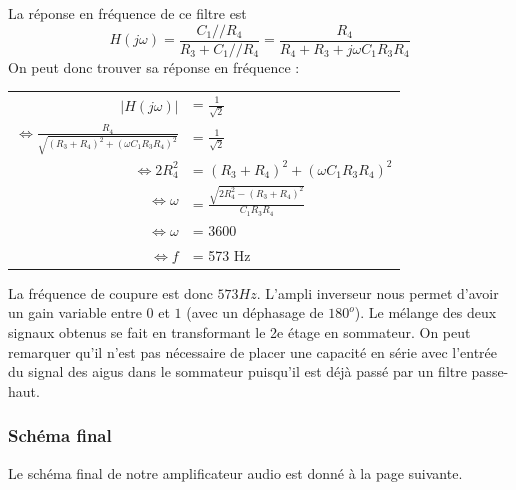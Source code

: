 La réponse en fréquence de ce filtre est $$H(j\omega) = \frac{C_1 // R_4}{R_3 + C_1 // R_4} = \frac{R_4}{R_4 + R_3 + j\omega C_1 R_3 R_4}$$
On peut donc trouver sa réponse en fréquence : 

\begin{tabular}{rl}
	$|H(j\omega)|$ &= $\frac{1}{\sqrt{2}}$ \\
	$\Leftrightarrow \frac{R_4}{\sqrt{(R_3 + R_4)^2 + (\omega C_1 R_3 R_4)^2}}$ &= $\frac{1}{\sqrt{2}}$ \\
	$\Leftrightarrow 2 R_4^2$ &= $(R_3 + R_4)^2 + (\omega C_1 R_3 R_4)^2$ \\
	$\Leftrightarrow \omega$ &= $\frac{\sqrt{2 R_4^2 - (R_3 + R_4)^2}}{C_1 R_3 R_4}$ \\
	$\Leftrightarrow \omega$ &= 3600 \\
	$\Leftrightarrow f$ &= 573 Hz
\end{tabular}


La fréquence de coupure est donc $573 Hz$.
L'ampli inverseur nous permet d'avoir un gain variable entre $0$ et $1$ (avec un déphasage de $180^{o}$).
Le mélange des deux signaux obtenus se fait en transformant le 2e étage en sommateur. On peut remarquer qu'il n'est pas nécessaire de placer une capacité en série avec l'entrée du signal des aigus dans le sommateur puisqu'il est déjà passé par un filtre passe-haut.

\subsubsection{Schéma final}
Le schéma final de notre amplificateur audio est donné à la page suivante.


